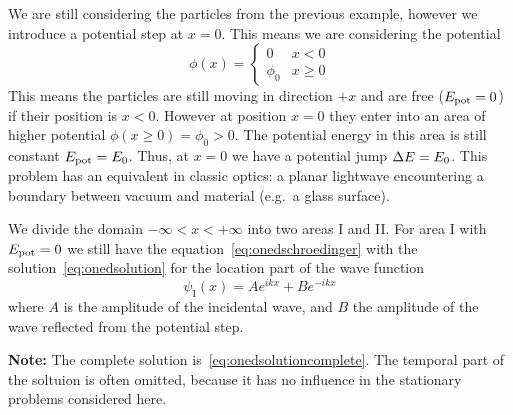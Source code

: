 \documentclass[../../script.tex]{subfiles}
\begin{document}
We are still considering the particles from the previous example, however we introduce a potential step at $x = 0$. This means we are considering the potential 
\[
	\phi(x) = \begin{cases}
		0 & x < 0 \\
		\phi_0 & x \ge 0
	\end{cases}
\]
This means the particles are still moving in direction $+x$ and are free ($E_{\text{pot}} = 0$) if their position is $x < 0$. However at position $x = 0$ they enter into an area of higher potential $\phi(x \ge 0) = \phi_0 > 0$.
The potential energy in this area is still constant $E_{\text{pot}} = E_{\text{0}}$. Thus, at $x = 0$ we have a potential jump $\Delta E = E_{\text{0}}$.
This problem has an equivalent in classic optics: a planar lightwave encountering a boundary between vacuum and material (e.g.\ a glass surface).

We divide the domain $-\infty < x < +\infty$ into two areas I and II\@. For area I with $E_{\text{pot}} = 0$ we still have the equation~\eqref{eq:onedschroedinger} with the solution~\eqref{eq:onedsolution}
for the location part of the wave function 
\[
	\psi_{\text{I}}(x) = Ae^{ikx} + Be^{-ikx}
\]
where $A$ is the amplitude of the incidental wave, and $B$ the amplitude of the wave reflected from the potential step.

\textbf{Note:} The complete solution is~\eqref{eq:onedsolutioncomplete}. The temporal part of the soltuion is often omitted, because it has no influence in the stationary problems considered here.
\end{document}
